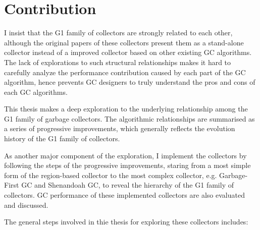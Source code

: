 

\section{Contribution}

I insist that the G1 family of collectors are strongly related to each other,
although the original papers of these collectors present them as a stand-alone collector
instead of a improved collector based on other existing GC algorithms. The lack of
explorations to such structural relationships makes it hard to carefully analyze
the performance contribution caused by each part of the GC algorithm, hence prevents
GC designers to truly understand the pros and cons of each GC algorithms.

This thesis makes a deep exploration to the underlying relationship among the
G1 family of garbage collectors. The algorithmic relationships are summarised
as a series of progressive improvements, which generally reflects the evolution
history of the G1 family of collectors.

As another major component of the exploration, I implement the collectors by following
the steps of the progressive improvements, staring from a most simple form of the
region-based collector to the most complex collector, e.g. Garbage-First GC and
Shenandoah GC, to reveal the hierarchy of the G1 family of collectors.
GC performance of these implemented collectors are also evaluated and discussed.

The general steps involved in thie thesis for exploring these collectors includes:

